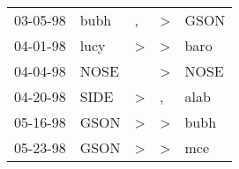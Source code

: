 \begin{supertabular}{p{0.07\textwidth}p{0.06\textwidth}p{0.02\textwidth}p{0.02\textwidth}p{0.06\textwidth}}
 03-05-98\textsuperscript{} &  bubh\textsuperscript{} &             , &  \textgreater &  GSON\textsuperscript{} \\
 04-01-98\textsuperscript{} &  lucy\textsuperscript{} &  \textgreater &  \textgreater &  baro\textsuperscript{} \\
 04-04-98\textsuperscript{} &  NOSE\textsuperscript{} &               &  \textgreater &  NOSE\textsuperscript{} \\
 04-20-98\textsuperscript{} &  SIDE\textsuperscript{} &  \textgreater &             , &  alab\textsuperscript{} \\
 05-16-98\textsuperscript{} &  GSON\textsuperscript{} &  \textgreater &  \textgreater &  bubh\textsuperscript{} \\
 05-23-98\textsuperscript{} &  GSON\textsuperscript{} &  \textgreater &  \textgreater &   mce\textsuperscript{} \\
\end{supertabular}

